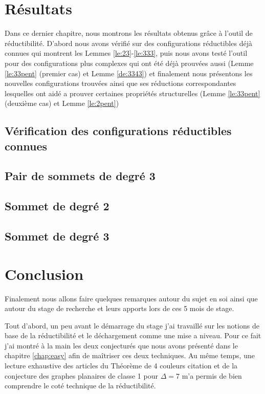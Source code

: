 \documentclass[10pt,a4paper]{article}
\begin{document}
\section{Résultats}
\label{chap:res}

Dans ce dernier chapitre, nous montrons les résultats obtenus grâce à l'outil de réductibilité. D'abord nous avons vérifié sur des configurations réductibles déjà connues qui montrent les Lemmes \ref{le:23}-\ref{le:333}, puis nous avons testé l'outil pour des configurations plus complexes qui ont été déjà prouvées aussi (Lemme \ref{le:33pent} (premier cas) et Lemme \ref{de:3343}) et finalement nous présentons les nouvelles configurations trouvées ainsi que ses réductions correspondantes lesquelles ont aidé a prouver certaines propriétés structurelles (Lemme \ref{le:33pent} (deuxième cas) et Lemme \ref{le:2pent})  

\subsection{Vérification des configurations réductibles connues}
\subsection{Pair de sommets de degré 3}
\subsection{Sommet de degré 2}
\subsection{Sommet de degré 3}

\section{Conclusion}
\label{chap:concl}
Finalement nous allons faire quelques remarques autour du sujet en soi ainsi que autour du stage de recherche et leurs apports lors de ces 5 mois de stage.

Tout d'abord, un peu avant le démarrage du stage j'ai travaillé sur les notions de base de la réductibilité et le déchargement comme une mise a niveau. Pour ce fait j'ai montré à la main les deux conjecturés que nous avons présenté dans le chapitre \ref{chap:easy} afin de maîtriser ces deux techniques. Au même temps, une lecture exhaustive des articles du Théorème de 4 couleurs {\color{blue}citation} et de la conjecture des graphes planaires de classe 1 pour $\Delta = 7$ \cite{SandersZhao} m'a permis de bien comprendre le coté technique de la réductibilité. 
\end{document}
